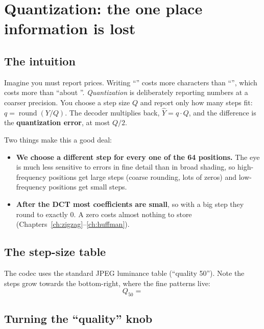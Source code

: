 \chapter{Quantization: the one place information is lost}\label{ch:quant}

\section{The intuition}

Imagine you must report prices. Writing ``'' costs more characters than ``'', which costs more than ``about ''. \emph{Quantization} is deliberately reporting numbers at a coarser precision. You choose a step size $Q$ and report only how many steps fit: $q=\operatorname{round}(Y/Q)$. The decoder multiplies back, $\hat Y = q\cdot Q$, and the difference is the \textbf{quantization error}, at most $Q/2$.

Two things make this a good deal:
\begin{itemize}
\item \textbf{We choose a different step for every one of the 64 positions.} The eye is much less sensitive to errors in fine detail than in broad shading, so high-frequency positions get large steps (coarse rounding, lots of zeros) and low-frequency positions get small steps.
\item \textbf{After the DCT most coefficients are small}, so with a big step they round to exactly 0. A zero costs almost nothing to store (Chapters~\ref{ch:zigzag}--\ref{ch:huffman}).
\end{itemize}

\section{The step-size table}

The codec uses the standard JPEG luminance table (``quality 50''). Note the steps grow towards the bottom-right, where the fine patterns live:
\[
Q_{50}=
\]

\section{Turning the ``quality'' knob}

